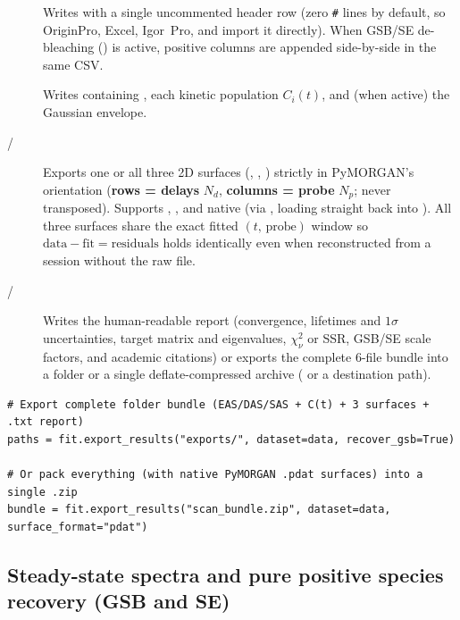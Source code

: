 \begin{description}
  \item[] Writes 
    with a single uncommented header row (zero \texttt{\#} lines by default, so
    OriginPro, Excel, Igor~Pro,  and
     import it directly). When GSB/SE
    de-bleaching () is active, positive 
    columns are appended side-by-side in the same CSV.
  \item[] Writes 
    containing , each kinetic population $C_i(t)$, and
    (when active) the Gaussian  envelope.
  \item[ / ] Exports one or all
    three 2D surfaces (, , ) strictly in
    PyMORGAN's  orientation (\textbf{rows = delays} $N_d$,
    \textbf{columns = probe} $N_p$; never transposed). Supports ,
    , and native  (via ,
    loading straight back into ). All three surfaces
    share the exact fitted $(t,\,\text{probe})$ window so
    $\text{data} - \text{fit} = \text{residuals}$ holds identically even when
    reconstructed from a  session without the raw file.
  \item[ / ] Writes the
    human-readable  report (convergence,
    lifetimes and $1\sigma$ uncertainties, target \Kmat{} matrix and
    eigenvalues, $\chi^2_\nu$ or SSR, GSB/SE scale factors, and academic
    citations) or exports the complete 6-file bundle into a folder or a single
    deflate-compressed  archive ( or a
     destination path).
\end{description}

\begin{lstlisting}
# Export complete folder bundle (EAS/DAS/SAS + C(t) + 3 surfaces + .txt report)
paths = fit.export_results("exports/", dataset=data, recover_gsb=True)

# Or pack everything (with native PyMORGAN .pdat surfaces) into a single .zip
bundle = fit.export_results("scan_bundle.zip", dataset=data, surface_format="pdat")
\end{lstlisting}

\subsection{Steady-state spectra and pure positive species recovery (GSB and SE)}\label{sec:groundstate}

